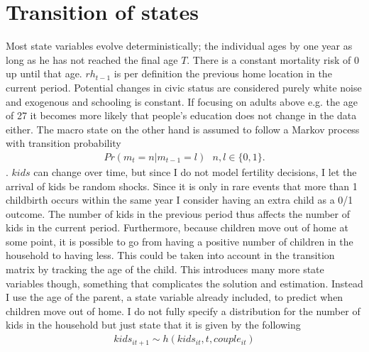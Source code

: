 \section{Transition of states}
Most state variables evolve deterministically; the individual ages by one year as long as he has not reached the final age $T$. There is a constant mortality risk of 0 up until that age. $rh_{t-1}$ is per definition the previous home location in the current period. Potential changes in civic status are considered purely white noise and exogenous and schooling is constant. If focusing on adults above e.g. the age of 27 it becomes more likely that people's education does not change in the data either. The macro state on the other hand is assumed to follow a Markov process with transition probability 
\begin{align}
Pr(m_t=n|m_{t-1}=l)\text{ }n,l\in\{0,1\}. \label{eq:macrodens}
\end{align}.
$kids$ can change over time, but since I do not model fertility decisions, I let the arrival of kids be random shocks. Since it is only in rare events that more than 1 childbirth occurs within the same year I consider having an extra child as a 0/1 outcome. The number of kids in the previous period thus affects the number of kids in the current period. Furthermore, because children move out of home at some point, it is possible to go from having a positive number of children in the household to having less. This could be taken into account in the transition matrix by tracking the age of the child. This introduces many more state variables though, something that complicates the solution and estimation. Instead I use the age of the parent, a state variable already included, to predict when children move out of home. I do not fully specify a distribution for the number of kids in the household but just state that it is given by the following
\begin{align}
kids_{it+1} \sim h(kids_{it},t,couple_{it}) \label{eq:kidsdens}
\end{align}

